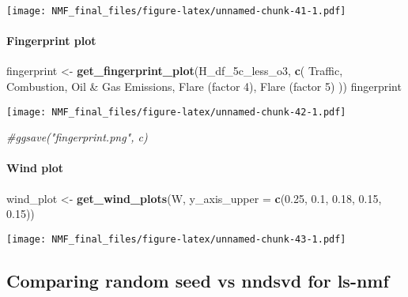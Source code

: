 \documentclass[
]{article}
\newenvironment{Shaded}{\begin{snugshade}}{\end{snugshade}}
\newcommand{\AttributeTok}[1]{\textcolor[rgb]{0.13,0.29,0.53}{#1}}
\newcommand{\CommentTok}[1]{\textcolor[rgb]{0.56,0.35,0.01}{\textit{#1}}}
\newcommand{\FloatTok}[1]{\textcolor[rgb]{0.00,0.00,0.81}{#1}}
\newcommand{\FunctionTok}[1]{\textcolor[rgb]{0.13,0.29,0.53}{\textbf{#1}}}
\newcommand{\NormalTok}[1]{#1}
\newcommand{\OtherTok}[1]{\textcolor[rgb]{0.56,0.35,0.01}{#1}}
\newcommand{\StringTok}[1]{\textcolor[rgb]{0.31,0.60,0.02}{#1}}
\begin{document}
\texttt{[image: NMF\_final\_files/figure-latex/unnamed-chunk-41-1.pdf]}

\paragraph{Fingerprint plot}\label{fingerprint-plot-1}

\begin{Shaded}
\begin{Highlighting}[]
\NormalTok{fingerprint }\OtherTok{\textless{}{-}} \FunctionTok{get\_fingerprint\_plot}\NormalTok{(H\_df\_5c\_less\_o3, }\FunctionTok{c}\NormalTok{(}
      \StringTok{\textquotesingle{}Traffic\textquotesingle{}}\NormalTok{,}
      \StringTok{\textquotesingle{}Combustion\textquotesingle{}}\NormalTok{,}
      \StringTok{\textquotesingle{}Oil \& Gas Emissions\textquotesingle{}}\NormalTok{,}
      \StringTok{\textquotesingle{}Flare (factor 4)\textquotesingle{}}\NormalTok{,}
      \StringTok{\textquotesingle{}Flare (factor 5)\textquotesingle{}}
\NormalTok{    ))}
\NormalTok{fingerprint}
\end{Highlighting}
\end{Shaded}

\texttt{[image: NMF\_final\_files/figure-latex/unnamed-chunk-42-1.pdf]}

\begin{Shaded}
\begin{Highlighting}[]
\CommentTok{\#ggsave("fingerprint.png", c)}
\end{Highlighting}
\end{Shaded}

\paragraph{Wind plot}\label{wind-plot-1}

\begin{Shaded}
\begin{Highlighting}[]
\NormalTok{wind\_plot }\OtherTok{\textless{}{-}} \FunctionTok{get\_wind\_plots}\NormalTok{(W, }\AttributeTok{y\_axis\_upper =} \FunctionTok{c}\NormalTok{(}\FloatTok{0.25}\NormalTok{, }\FloatTok{0.1}\NormalTok{, }\FloatTok{0.18}\NormalTok{, }\FloatTok{0.15}\NormalTok{, }\FloatTok{0.15}\NormalTok{))}
\end{Highlighting}
\end{Shaded}

\texttt{[image: NMF\_final\_files/figure-latex/unnamed-chunk-43-1.pdf]}

\subsection{Comparing random seed vs nndsvd for
ls-nmf}\label{comparing-random-seed-vs-nndsvd-for-ls-nmf}
\end{document}
